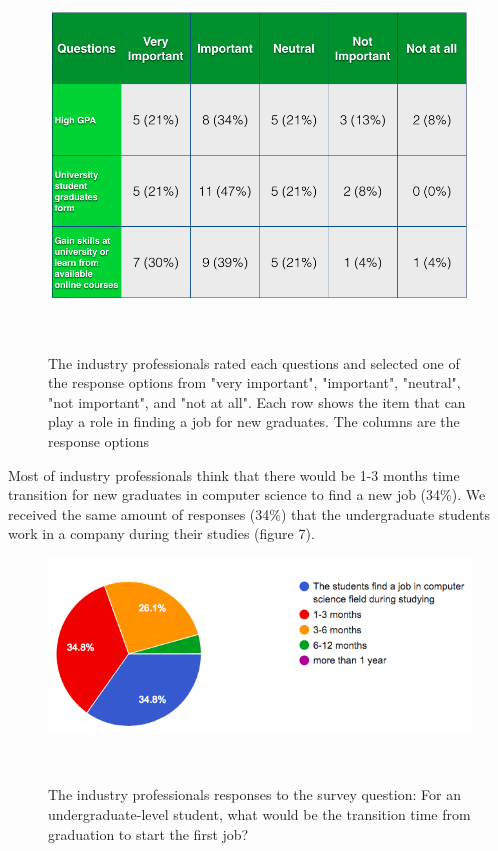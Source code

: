 \documentclass{sigchi}
\begin{document}
\begin{figure}
\centering
  \includegraphics[width=1.05\columnwidth]{figures/important_notimportant_table_i}
  \caption{The industry professionals rated each questions and selected one of the response options from "very important", "important", "neutral", "not important", and "not at all". Each row shows the item that can play a role in finding a job for new graduates. The columns are the response options}~\label{fig:figure6}
\end{figure}

Most of industry professionals think that there would be 1-3 months time transition for new graduates in computer science to find a new job (34\%). We received the same amount of responses (34\%) that the undergraduate students work in a company during their studies (figure 7).

\begin{figure}
\centering
  \includegraphics[width=1.05\columnwidth]{figures/transition_time_i}
  \caption{The industry professionals responses to the survey question: For an undergraduate-level student, what would be the transition time from graduation to start the first job? }~\label{fig:figure7}
\end{figure}
\end{document}
